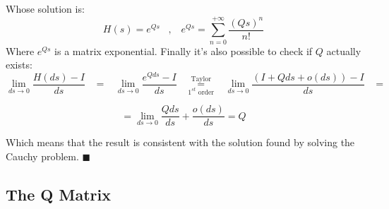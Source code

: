 \documentclass[12pt,a4paper]{article}
\begin{document}
\begin{enumerate}
\noindent 
Whose solution is:
$$
H(s)=e^{Qs}\hspace{10pt},\hspace{10pt}e^{Qs}=\sum_{n=0}^{+\infty}{\frac{\left( Qs\right)^n}{n!}}
$$ 
Where $e^{Qs}$ is a matrix exponential. Finally it's also possible to check if $Q$ actually exists:
$$
\lim_{ds\rightarrow 0}{\frac{H(ds)-I}{ds}}\hspace{10pt}=
\hspace{10pt}\lim_{ds\rightarrow 0}{\frac{e^{Qds}-I}{ds}}
\hspace{10pt}
\overset{\textrm{Taylor}}{\underset{1^{st}\textrm{ order}}{=}}
\hspace{10pt}
\lim_{ds\rightarrow 0}{\frac{(I+Qds+o(ds))-I}{ds}}\hspace{10pt}=
$$

\medskip
$$
=\lim_{ds\rightarrow 0}{\frac{Qds}{ds}+\frac{o(ds)}{ds}}=Q
$$

\medskip
Which means that the result is consistent with the solution found by solving the Cauchy problem.
\hspace{373pt}$\blacksquare$
\end{enumerate}

\newpage
\subsection{The Q Matrix}
\end{document}
